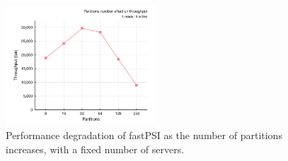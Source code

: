 \begin{figure}[t]
\begin{center}
\includegraphics[width=0.5\textwidth]{figures/psi_partitions_throughput.pdf}
\vspace{-0.75cm}
\end{center}
\caption{Performance degradation of fastPSI as the number of partitions increases, with a fixed number of servers.}
\label{fig:fastpsi_partition_throughput}
\end{figure}
